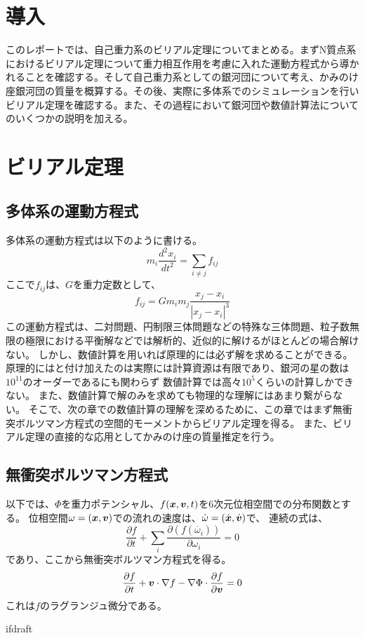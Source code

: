 \documentclass{jsarticle}
\begin{document}
\fi
\section  {導入}
このレポートでは、自己重力系のビリアル定理についてまとめる。まずN質点系におけるビリアル定理について重力相互作用を考慮に入れた運動方程式から導かれることを確認する。そして自己重力系としての銀河団について考え、かみのけ座銀河団の質量を概算する。その後、実際に多体系でのシミュレーションを行いビリアル定理を確認する。また、その過程において銀河団や数値計算法についてのいくつかの説明を加える。
\section  {ビリアル定理}
\subsection{多体系の運動方程式}
多体系の運動方程式は以下のように書ける。
\begin{equation}
	m_i \frac{d^2x_i}{dt^2} = \sum_{i \neq j} f_{ij}
\end{equation}	
ここで$f_{ij}$は、$G$を重力定数として、
\begin{equation}
	f_{ij} = G m_i m_j \frac{x_j - x_i}{|x_j - x_i|^3}
\end{equation}	
この運動方程式は、二対問題、円制限三体問題などの特殊な三体問題、粒子数無限の極限における平衡解などでは解析的、近似的に解けるがほとんどの場合解けない。
しかし、数値計算を用いれば原理的には必ず解を求めることができる。原理的にはと付け加えたのは実際には計算資源は有限であり、銀河の星の数は$10^{11}$のオーダーであるにも関わらず
数値計算では高々$10^5$くらいの計算しかできない。
また、数値計算で解のみを求めても物理的な理解にはあまり繋がらない。
そこで、次の章での数値計算の理解を深めるために、この章ではまず無衝突ボルツマン方程式の空間的モーメントからビリアル定理を得る。
また、ビリアル定理の直接的な応用としてかみのけ座の質量推定を行う。

\subsection{無衝突ボルツマン方程式}
以下では、$\Phi$を重力ポテンシャル、$f(\bm{x}, \bm{v}, t)$を6次元位相空間での分布関数とする。
位相空間$\omega = (\bm{x}, \bm{v})$での流れの速度は、$\dot{\omega} = (\dot{\bm{x}}, \dot{\bm{v}})$で、
連続の式は、
\begin{equation}	
	\frac{\partial f}{\partial t} + \sum_i \frac{\partial (f(\dot{\omega_i}))}{\partial \omega_i} = 0
\end{equation}	
であり、ここから無衝突ボルツマン方程式を得る。
\begin{equation}	
	\label{bolzman}
	\frac{\partial f}{\partial t} + \bm{v}\cdot\nabla f - \nabla\Phi\cdot\frac{\partial f}{\partial \bm{v}}= 0
\end{equation}	
これは$f$のラグランジュ微分である。

\expandafter\ifx\csname ifdraft\endcsname\relax
  
\end{document}
